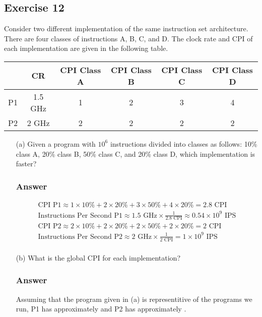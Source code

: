\documentclass[12pt]{article}
\begin{document}
\subsection*{Exercise 12}
Consider two different implementation of the same instruction set architecture. There are four classes of instructions A, B, C, and D. The clock rate and CPI of each implementation are given in the following table.
\begin{center}
\begin{tabular}{| c | c | c | c | c | c |}
\hline
& CR & CPI Class A & CPI Class B & CPI Class C & CPI Class D \\
\hline
P1 & 1.5 GHz & 1 & 2 & 3 & 4 \\
\hline
P2 & 2 GHz & 2 & 2 & 2 & 2 \\
\hline
\end{tabular}
\end{center}
\begin{itemize}
\item[(a)] Given a program with $10^6$ instructions divided into classes as follows: 10\% class A, 20\% class B, 50\% class C, and 20\% class D, which implementation is faster?
\subsubsection*{Answer}
\begin{align*}
\text{CPI P1} \approx 1 \times 10\% + 2 \times 20\% + 3 \times 50\% + 4 \times 20\% = 2.8\text{ CPI} \\
\text{Instructions Per Second P1} \approx 1.5\text{ GHz} \times \frac{1}{2.8\text{ CPI}} \approx 0.54 \times 10^9\text{ IPS} \\
\text{CPI P2} \approx 2 \times 10\% + 2 \times 20\% + 2 \times 50\% + 2 \times 20\% = 2\text{ CPI} \\
\text{Instructions Per Second P2} \approx 2\text{ GHz} \times \frac{1}{2\text{ CPI}} = 1 \times 10^9\text{ IPS} \\
\end{align*}
\item[(b)] What is the global CPI for each implementation?
\subsubsection*{Answer}
Assuming that the program given in (a) is representitive of the programs we run, P1 has approximately  and P2 has approximately .
\end{itemize}
\end{document}
